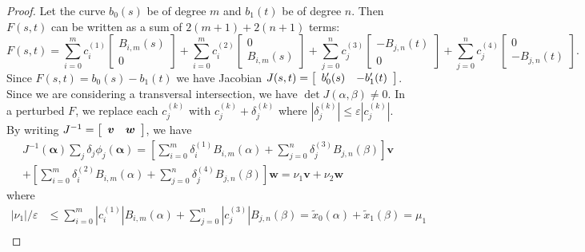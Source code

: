 \documentclass[3p, authoryear, square]{elsarticle}
\theoremstyle{definition}
\newcommand{\eps}{\varepsilon}
\begin{document}
\begin{proof}
Let the curve \(b_0(s)\) be of degree \(m\) and \(b_1(t)\) be of degree \(n\).
Then \(F(s, t)\) can be written as a sum of \(2(m + 1) + 2(n + 1)\) terms:
\begin{equation}\label{eq:bezier-full-basis}
F(s, t) =
  \sum_{i = 0}^m c_i^{(1)} \left[ \begin{array}{c}
  B_{i, m}(s) \\ 0 \end{array}\right] +
  \sum_{i = 0}^m c_i^{(2)} \left[ \begin{array}{c}
  0 \\ B_{i, m}(s) \end{array}\right] +
  \sum_{j = 0}^n c_j^{(3)} \left[ \begin{array}{c}
  -B_{j, n}(t) \\ 0 \end{array}\right] +
  \sum_{j = 0}^n c_j^{(4)} \left[ \begin{array}{c}
  0 \\ -B_{j, n}(t) \end{array}\right].
\end{equation}
Since \(F(s, t) = b_0(s) - b_1(t)\) we have Jacobian \(J(s, t) =
\left[ \begin{array}{c c} b_0'(s) & -b_1'(t) \end{array}\right]\). Since we
are considering a transversal intersection, we have
\(\det J(\alpha, \beta) \neq 0\). In a perturbed \(F\), we replace each
\(c_j^{(k)}\) with \(c_j^{(k)} + \delta_j^{(k)}\) where
\(\left|\delta_j^{(k)}\right| \leq \eps \left|c_j^{(k)}\right|\).
By writing \(J^{-1} = \left[ \begin{array}{c c}
\bm{v} & \bm{w} \end{array}\right]\), we have
\begin{multline}
J^{-1}\left(\bm{\alpha}\right) \sum_j \delta_j
  \phi_j\left(\bm{\alpha}\right) =
  \left[\sum_{i = 0}^m \delta_i^{(1)} B_{i, m}(\alpha) +
  \sum_{j = 0}^n \delta_j^{(3)} B_{j, n}(\beta)\right] \bm{v} \\
  + \left[\sum_{i = 0}^m \delta_i^{(2)} B_{i, m}(\alpha) +
  \sum_{j = 0}^n \delta_j^{(4)} B_{j, n}(\beta)\right] \bm{w} =
  \nu_1 \bm{v} + \nu_2 \bm{w}
\end{multline}
where
\begin{align}
\left|\nu_1\right| / \eps &\leq \sum_{i = 0}^m
  \left|c_{i}^{(1)}\right| B_{i, m}\left(\alpha\right) + \sum_{j = 0}^n
  \left|c_{j}^{(3)}\right| B_{j, n}\left(\beta\right) =
  \widetilde{x}_0(\alpha) + \widetilde{x}_1(\beta) = \mu_1 \\

\end{align}
\end{proof}
\end{document}
